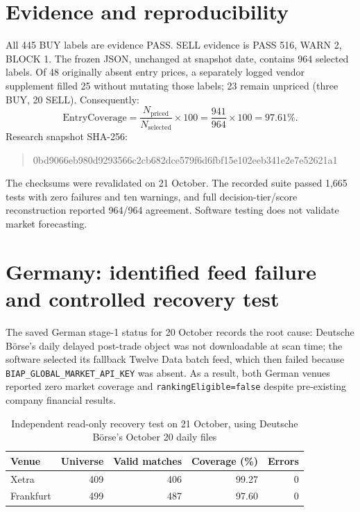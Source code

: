 \documentclass[11pt,a4paper]{article}
\begin{document}
\section{Evidence and reproducibility}
All 445 BUY labels are evidence PASS. SELL evidence is PASS 516, WARN 2, BLOCK 1. The frozen JSON, unchanged at snapshot date, contains 964 selected labels. Of 48 originally absent entry prices, a separately logged vendor supplement filled 25 without mutating those labels; 23 remain unpriced (three BUY, 20 SELL). Consequently:
\begin{equation}
\mathrm{EntryCoverage}=\frac{N_{\mathrm{priced}}}{N_{\mathrm{selected}}}\times100
=\frac{941}{964}\times100=97.61\%.
\label{eq:coverage}
\end{equation}
Research snapshot SHA-256:
\begin{quote}\ttfamily\footnotesize
0bd9066eb980d9293566c2cb682dce579f6d6fbf15e102eeb341e2e7e52621a1
\end{quote}
The checksums were revalidated on 21 October. The recorded suite passed 1,665 tests with zero failures and ten warnings, and full decision-tier/score reconstruction reported 964/964 agreement. Software testing does not validate market forecasting.

\section{Germany: identified feed failure and controlled recovery test}
The saved German stage-1 status for 20 October records the root cause: Deutsche B\"orse's daily delayed post-trade object was not downloadable at scan time; the software selected its fallback Twelve Data batch feed, which then failed because \texttt{BIAP\_GLOBAL\_MARKET\_API\_KEY} was absent. As a result, both German venues reported zero market coverage and \texttt{rankingEligible=false} despite pre-existing company financial results.

\begin{table}[ht]
\centering\small
\caption{Independent read-only recovery test on 21 October, using Deutsche B\"orse's October 20 daily files}
\begin{tabular}{lrrrr}
\toprule
Venue & Universe & Valid matches & Coverage (\%) & Errors\\\midrule
Xetra & 409 & 406 & 99.27 & 0\\
Frankfurt & 499 & 487 & 97.60 & 0\\\bottomrule
\end{tabular}
\label{tab:germany}
\end{table}
\end{document}
